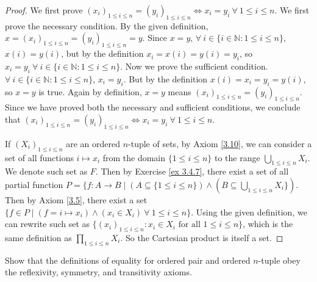 \begin{proof}
We first prove \((x_i)_{1 \leq i \leq n} = (y_i)_{1 \leq i \leq n} \iff x_i = y_i \ \forall\ 1 \leq i \leq n\).
We first prove the necessary condition.
By the given definition, \(x = (x_i)_{1 \leq i \leq n} = (y_i)_{1 \leq i \leq n} = y\).
Since \(x = y\), \(\forall\ i \in \{i \in \mathds{N}: 1 \leq i \leq n\}\), \(x(i) = y(i)\), but by the definition \(x_i = x(i) = y(i) = y_i\), so \(x_i = y_i \ \forall\ i \in \{i \in \mathds{N} : 1 \leq i \leq n\}\).
Now we prove the sufficient condition.
\(\forall\ i \in \{i \in \mathds{N} : 1 \leq i \leq n\}\), \(x_i = y_i\).
But by the definition \(x(i) = x_i = y_i = y(i)\), so \(x = y\) is true.
Again by definition, \(x = y\) means \((x_i)_{1 \leq i \leq n} = (y_i)_{1 \leq i \leq n}\).
Since we have proved both the necessary and sufficient conditions, we conclude that \((x_i)_{1 \leq i \leq n} = (y_i)_{1 \leq i \leq n} \iff x_i = y_i \ \forall\ 1 \leq i \leq n\).

If \((X_i)_{1 \leq i \leq n}\) are an ordered \(n\)-tuple of sets, by Axiom \ref{3.10}, we can consider a set of all functions \(i \mapsto x_i\) from the domain \(\{1 \leq i \leq n\}\) to the range \(\bigcup_{1 \leq i \leq n} X_i\).
We denote such set as \(F\).
Then by Exercise \ref{ex 3.4.7}, there exist a set of all partial function \(P = \{f : A \to B \mid (A \subseteq \{1 \leq i \leq n\}) \land (B \subseteq \bigcup_{1 \leq i \leq n} X_i\})\).
Then by Axiom \ref{3.5}, there exist a set \(\{f \in P \mid (f = i \mapsto x_i) \land (x_i \in X_i) \ \forall\ 1 \leq i \leq n\}\).
Using the given definition, we can rewrite such set as \(\{(x_i)_{1 \leq i \leq n} : x_i \in X_i \text{ for all } 1 \leq i \leq n\}\), which is the same definition as \(\prod_{1 \leq i \leq n} X_i\).
So the Cartesian product is itself a set.
\end{proof}

\begin{exercise}\label{ex 3.5.3}
Show that the definitions of equality for ordered pair and ordered \(n\)-tuple obey the reflexivity, symmetry, and transitivity axioms.
\end{exercise}

